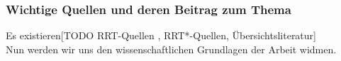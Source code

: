 \subsubsection{Wichtige Quellen und deren Beitrag zum Thema}
Es existieren[TODO RRT-Quellen \citep[vgl][]{Lav98}, RRT*-Quellen, Übersichtsliteratur]
\\
Nun werden wir uns den wissenschaftlichen Grundlagen der Arbeit widmen.

